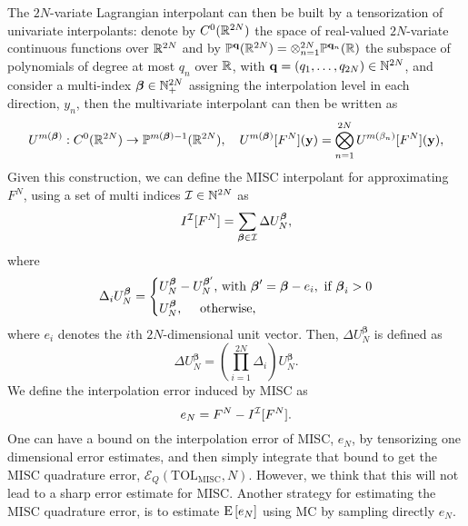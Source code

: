 The $2N$-variate Lagrangian interpolant can then be built by a tensorization of univariate interpolants: denote by $C^0(\mathbb{R}^{2N})$ the space of real-valued $2N$-variate continuous functions over $\mathbb{R}^{2N}$ and by $\mathbb{P}^{\mathbf{q}}(\mathbb{R}^{2N}) = \otimes_{n=1}^{2N} \mathbb{P}^{\mathbf{q}_n}(\mathbb{R})$ the subspace of polynomials of degree at most $q_n$ over $\mathbb{R}$, with $\mathbf{q}=(q_1,\dots,q_{2N})\in  \mathbb{N}^{2N}$, and consider a multi-index $\boldsymbol{\beta} \in \mathbb{N}^{2N}_+$ assigning the interpolation level in each direction, $y_n$, then  the multivariate interpolant can then be written as
$$U^{m(\boldsymbol{\beta})}: C^0(\mathbb{R}^{2N}) \rightarrow \mathbb{P}^{m(\boldsymbol{\beta})-1}(\mathbb{R}^{2N}) ,\quad  U^{m(\boldsymbol{\beta})}[F^N](\mathbf{y})= \bigotimes_{n = 1}^{2N} U^{m(\beta_n)} [F^N](\mathbf{y}) , $$
Given this construction, we can define the MISC interpolant  for approximating $F^N$, using a set of multi indices $\mathcal{I} \in \mathbb{N}^{2N}$ as
\begin{equation}
I^{\mathcal{I}}[F^N]= \sum_{\boldsymbol{\beta} \in \mathcal{I}} \Delta U_N^{\boldsymbol{\beta}} ,
\end{equation}
where 
\begin{equation*}
\Delta_i U_N^{\boldsymbol{\beta}} = \left\{ 
\aligned 
 U_N^{\boldsymbol{\beta}} &- U_N^{\boldsymbol{\beta}'}  \text{, with } \boldsymbol{\beta}' =\boldsymbol{\beta} - e_i, \text{ if } \boldsymbol{\beta}_i>0 \\
 U_N^{\boldsymbol{\beta}} &, \quad  \text{ otherwise,}
\endaligned
\right.
\end{equation*}
where $e_i$ denotes the $i$th $2N$-dimensional unit vector. Then, $\Delta
U_N^{\boldsymbol{\beta}}$ is defined as
\begin{equation*}
\Delta U_N^{\boldsymbol{\beta}} = \left( \prod_{i=1}^{2N} \Delta_i \right) U_N^{\boldsymbol{\beta}}.
\end{equation*}
We define the interpolation error induced by MISC as
\begin{equation}
e_{N}= F^N-I^{\mathcal{I}}[F^N] .
\end{equation}
One can have a bound on the interpolation error of MISC, $e_{N}$, by tensorizing one dimensional error estimates, and  then simply integrate that bound to get the MISC quadrature error, $\mathcal{E}_Q(\text{TOL}_{\text{MISC}},N)$. However, we think that this will  not lead to a sharp error estimate for MISC. Another strategy for estimating the MISC quadrature error, is to estimate $\mathrm{E}\left[e_N\right]$ using MC by sampling directly $e_N$. 

